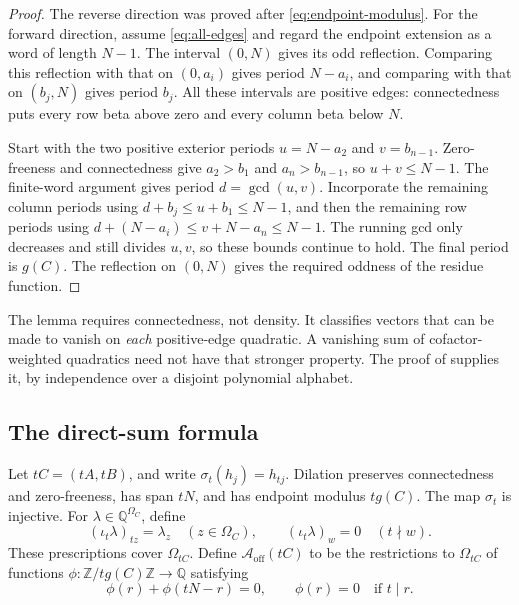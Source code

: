 \documentclass[11pt,a4paper]{amsart}
\numberwithin{equation}{section}
\theoremstyle{plain}
\theoremstyle{definition}
\newcommand{\Q}{\mathbb Q}
\newcommand{\Z}{\mathbb Z}
\begin{document}
\begin{proof}
The reverse direction was proved after \eqref{eq:endpoint-modulus}.
For the forward direction, assume \eqref{eq:all-edges} and regard the
endpoint extension as a word of length \(N-1\).  The interval \((0,N)\) gives its odd reflection.  Comparing this
reflection with that on \((0,a_i)\) gives period \(N-a_i\), and comparing
with that on \((b_j,N)\) gives period \(b_j\).  All these intervals are
positive edges: connectedness puts every row beta above zero and every column
beta below \(N\).

Start with the two positive exterior periods \(u=N-a_2\) and \(v=b_{n-1}\).
Zero-freeness and connectedness give \(a_2>b_1\) and \(a_n>b_{n-1}\), so
\(u+v\le N-1\).  The finite-word argument gives period \(d=\gcd(u,v)\).
Incorporate the remaining column periods using \(d+b_j\le u+b_1\le N-1\),
and then the remaining row periods using
\(d+(N-a_i)\le v+N-a_n\le N-1\).
The running gcd only decreases and still divides \(u,v\), so these bounds
continue to hold.  The final period is \(g(C)\).  The reflection on
\((0,N)\) gives the required oddness of the residue function.
\end{proof}

The lemma requires connectedness, not density.  It classifies vectors that
can be made to vanish on \emph{each} positive-edge quadratic.  A vanishing
sum of cofactor-weighted quadratics need not have that stronger property.
The proof of  supplies it, by independence over a disjoint
polynomial alphabet.

\subsection{The direct-sum formula}

Let \(tC=(tA,tB)\), and write
\(\sigma_t(h_j)=h_{tj}\).  Dilation preserves connectedness and
zero-freeness, has span \(tN\), and has endpoint modulus \(tg(C)\).
The map \(\sigma_t\) is injective.
For \(\lambda\in\Q^{\Omega_C}\), define
\[
 (\iota_t\lambda)_{tz}=\lambda_z\quad(z\in\Omega_C),\qquad
 (\iota_t\lambda)_w=0\quad(t\nmid w).
\]
These prescriptions cover \(\Omega_{tC}\).
Define \(\mathcal A_{\mathrm{off}}(tC)\) to be the restrictions to
\(\Omega_{tC}\) of functions \(\phi:\Z/tg(C)\Z\to\Q\) satisfying
\begin{equation}\label{eq:offgrid-space}
 \phi(r)+\phi(tN-r)=0,\qquad
 \phi(r)=0\quad\text{if }t\mid r.
\end{equation}
\end{document}

